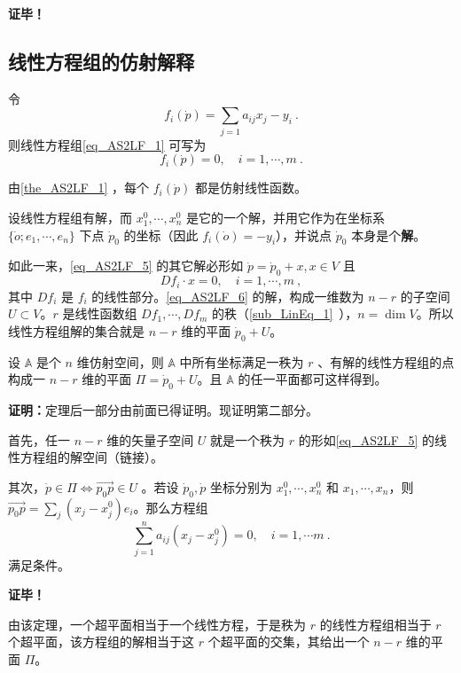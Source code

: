 \textbf{证毕！}
\subsection{线性方程组的仿射解释}
令
\begin{equation}\label{eq_AS2LF_7}
f_i(\dot p)=\sum_{j=1}a_{ij}x_j-y_i~.
\end{equation}
则线性方程组\autoref{eq_AS2LF_1} 可写为
\begin{equation}\label{eq_AS2LF_5}
f_i(\dot p)=0,\quad i=1,\cdots,m~.
\end{equation}

由\autoref{the_AS2LF_1} ，每个 $f_i(\dot p)$ 都是仿射线性函数。

设线性方程组有解，而 $x_1^0,\cdots,x_n^0$ 是它的一个解，并用它作为在坐标系 $\{\dot o;e_1,\cdots,e_n\}$ 下点 $\dot p_0$ 的坐标（因此 $f_i(\dot o)=-y_i$），并说点 $\dot p_0$ 本身是个\textbf{解}。

如此一来，\autoref{eq_AS2LF_5} 的其它解必形如 $\dot p=\dot p_0+x, x\in V$ 且
\begin{equation}\label{eq_AS2LF_6}
 Df_i \cdot x=0,\quad i=1,\cdots,m~,
\end{equation}
其中 $Df_i$ 是 $f_i$ 的线性部分。\autoref{eq_AS2LF_6} 的解，构成一维数为 $n-r$ 的子空间 $U\subset V$。$r$ 是线性函数组 $Df_1,\cdots,Df_m$ 的秩（\autoref{sub_LinEq_1}~），$n=\dim V$。所以线性方程组解的集合就是 $n-r$ 维的平面 $\dot p_0+U$。

\begin{theorem}{}
设 $\mathbb A$ 是个 $n$ 维仿射空间，则 $\mathbb A$ 中所有坐标满足一秩为 $r$ 、有解的线性方程组的点构成一 $n-r$ 维的平面 $\Pi=\dot p_0+U$。且 $\mathbb A$ 的任一平面都可这样得到。
\end{theorem}
\textbf{证明：}定理后一部分由前面已得证明。现证明第二部分。

首先，任一 $n-r$ 维的矢量子空间 $U$ 就是一个秩为 $r$ 的形如\autoref{eq_AS2LF_5}  的线性方程组的解空间（链接）。

其次，$\dot p\in\Pi\Leftrightarrow\vec{p_0p}\in U$ 。若设 $\dot p_0,\dot p$ 坐标分别为 $x^0_1,\cdots,x^0_n$ 和 $x_1,\cdots,x_n$，则 $\vec{p_0p}=\sum_{j}(x_j-x^0_j)e_i$。那么方程组
\begin{equation}
\sum_{j=1}^n a_{ij}(x_j-x_j^0)=0,\quad i=1,\cdots m~.
\end{equation}
 满足条件。

 \textbf{证毕！}

由该定理，一个超平面相当于一个线性方程，于是秩为 $r$ 的线性方程组相当于 $r$ 个超平面，该方程组的解相当于这 $r$ 个超平面的交集，其给出一个 $n-r$ 维的平面 $\Pi$。
